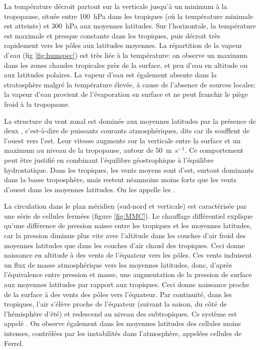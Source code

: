 
\sk
La température décroit partout sur la verticale jusqu'à un minimum à la tropopause, située entre 100~hPa dans les tropiques (où la température minimale est atteinte) et 300~hPa aux moyennes latitudes. Sur l'horizontale, la température est maximale et presque constante dans les tropiques, puis décroit très rapidement vers les pôles aux latitudes moyennes. La répartition de la vapeur d'eau (fig \ref{fig:humspec}) est très liée à la température: on observe un maximum dans les zones chaudes tropicales près de la surface, et peu d'eau en altitude ou aux latitudes polaires. La vapeur d'eau est également absente dans la stratosphère malgré la température élevée, à cause de l'absence de sources locales: la vapeur d'eau provient de l'évaporation en surface et ne peut franchir le piège froid à la tropopause.


\sk
La structure du vent zonal est dominée aux moyennes latitudes par la présence de deux , c'est-à-dire de puissants courants atmosphériques, dits  car ils soufflent de l'ouest vers l'est. Leur vitesse augmente sur la verticale entre la surface et un maximum au niveau de la tropopause, autour de 50~m~s$^{-1}$. Ce comportement peut être justifié en combinant l'équilibre géostrophique à l'équilibre hydrostatique. Dans les tropiques, les vents moyens sont d'est, surtout dominants dans la basse troposphère, mais restent néanmoins moins forts que les vents d'ouest dans les moyennes latitudes. On les appelle les .

\sk
La circulation dans le plan méridien (sud-nord et verticale) est caractérisée par une série de cellules fermées (figure \ref{fig:MMC}). Le chauffage différentiel explique qu'une différence de pression naisse entre les tropiques et les moyennes latitudes, car la pression diminue plus vite avec l'altitude dans les couches d'air froid des moyennes latitudes que dans les couches d'air chaud des tropiques. Ceci donne naissance en altitude à des vents de l'équateur vers les pôles. Ces vents induisent un flux de masse atmosphérique vers les moyennes latitudes, donc, d'après l'équivalence entre pression et masse, une augmentation de la pression de surface aux moyennes latitudes par rapport aux tropiques. Ceci donne naissance proche de la surface à des vents des pôles vers l'équateur. Par continuité, dans les tropiques, l'air s'élève proche de l'équateur (suivant la saison, du côté de l'hémisphère d'été) et redescend au niveau des subtropiques. Ce système est appelé . On observe également dans les moyennes latitudes des cellules moins intenses, contrôlées par les instabilités dans l'atmosphère, appelées cellules de Ferrel. 

